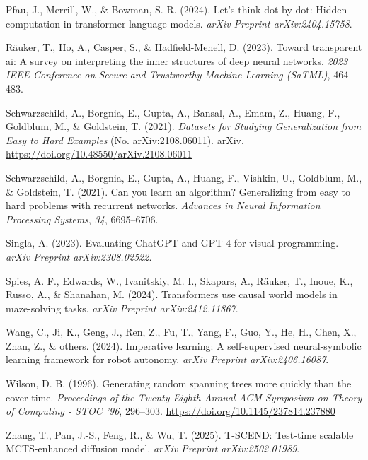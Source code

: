 \documentclass[10pt,a4paper,onecolumn]{article}
\newlength{\cslhangindent}
\newenvironment{CSLReferences}[2] %
 {\begin{list}{}{%
  \setlength{\itemindent}{0pt}
  \setlength{\leftmargin}{0pt}
  \setlength{\parsep}{0pt}
  \ifodd #1
   \setlength{\leftmargin}{\cslhangindent}
   \setlength{\itemindent}{-1\cslhangindent}
  \fi
  \setlength{\itemsep}{#2\baselineskip}}}
 {\end{list}}
\begin{document}
\begin{CSLReferences}{1}{0.5}
\leavevmode{}%
Pfau, J., Merrill, W., \& Bowman, S. R. (2024). Let's think dot by dot:
Hidden computation in transformer language models. \emph{arXiv Preprint
arXiv:2404.15758}.

\leavevmode{}%
Räuker, T., Ho, A., Casper, S., \& Hadfield-Menell, D. (2023). Toward
transparent ai: A survey on interpreting the inner structures of deep
neural networks. \emph{2023 IEEE Conference on Secure and Trustworthy
Machine Learning (SaTML)}, 464--483.

\leavevmode{}%
Schwarzschild, A., Borgnia, E., Gupta, A., Bansal, A., Emam, Z., Huang,
F., Goldblum, M., \& Goldstein, T. (2021). \emph{Datasets for {Studying
Generalization} from {Easy} to {Hard Examples}} (No. arXiv:2108.06011).
{arXiv}. \url{https://doi.org/10.48550/arXiv.2108.06011}

\leavevmode{}%
Schwarzschild, A., Borgnia, E., Gupta, A., Huang, F., Vishkin, U.,
Goldblum, M., \& Goldstein, T. (2021). Can you learn an algorithm?
Generalizing from easy to hard problems with recurrent networks.
\emph{Advances in Neural Information Processing Systems}, \emph{34},
6695--6706.

\leavevmode{}%
Singla, A. (2023). Evaluating ChatGPT and GPT-4 for visual programming.
\emph{arXiv Preprint arXiv:2308.02522}.

\leavevmode{}%
Spies, A. F., Edwards, W., Ivanitskiy, M. I., Skapars, A., Räuker, T.,
Inoue, K., Russo, A., \& Shanahan, M. (2024). Transformers use causal
world models in maze-solving tasks. \emph{arXiv Preprint
arXiv:2412.11867}.

\leavevmode{}%
Wang, C., Ji, K., Geng, J., Ren, Z., Fu, T., Yang, F., Guo, Y., He, H.,
Chen, X., Zhan, Z., \& others. (2024). Imperative learning: A
self-supervised neural-symbolic learning framework for robot autonomy.
\emph{arXiv Preprint arXiv:2406.16087}.

\leavevmode{}%
Wilson, D. B. (1996). Generating random spanning trees more quickly than
the cover time. \emph{Proceedings of the Twenty-Eighth Annual {ACM}
Symposium on {Theory} of Computing - {STOC} '96}, 296--303.
\url{https://doi.org/10.1145/237814.237880}

\leavevmode{}%
Zhang, T., Pan, J.-S., Feng, R., \& Wu, T. (2025). T-SCEND: Test-time
scalable MCTS-enhanced diffusion model. \emph{arXiv Preprint
arXiv:2502.01989}.

\end{CSLReferences}
\end{document}
